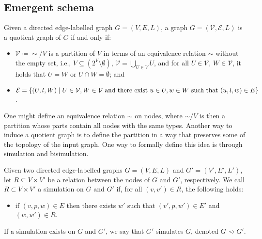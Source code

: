 \subsection{Emergent schema}\label{app:emergent-schema}
\begin{definition}\label{def:quotient-graph}
    Given a directed edge-labelled graph $G = (V, E, L)$, a graph $G = (\mathcal{V}, \mathcal{E}, L)$ is a quotient graph of $G$ if and only if:
        \begin{itemize}
                \item $\mathcal{V}\coloneqq \sim/V$ is a partition of $V$ in terms of an equivalence relation $\sim$ without the empty set, i.e., $V \subseteq (2^V \setminus \emptyset)$, $\mathcal{V} = \bigcup_{U \in V} U$, and for all $U \in \mathcal{V}$, $W \in \mathcal{V}$, it holds that $U = W$ or $U \cap W = \emptyset$; and
                \item $\mathcal{E} = \{(U, l, W) \mid U \in \mathcal{V}, W \in \mathcal{V} \text{ and there exist } u \in U, w \in W \text{ such that }\\ (u, l, w) \in E\}$.
        \end{itemize}
\end{definition}

One might define an equivalence relation $\sim$ on nodes, where $\sim/ V$ is then a partition whose parts contain all nodes with the same types. Another way to induce a quotient graph is to define the partition in a way that preserves some of the topology of the input graph. One way to formally define this idea is through simulation and bisimulation.

\begin{definition}[Simulation]
    Given two directed edge-labelled graphs $G = (V, E, L)$ and $G' = (V', E', L')$, let $R \subseteq V \times V'$ be a relation between the nodes of $G$ and $G'$, respectively. We call $R\subset V\times V'$ a simulation on $G$ and $G'$ if, for all $(v, v') \in R$, the following holds:
    \begin{itemize}
        \item if $(v, p, w) \in E$ then there exists $w'$ such that $(v', p, w') \in E'$ and $(w, w') \in R$.
    \end{itemize}
If a simulation exists on $G$ and $G'$, we say that $G'$ simulates $G$, denoted $G \rightsquigarrow G'$.
\end{definition}

